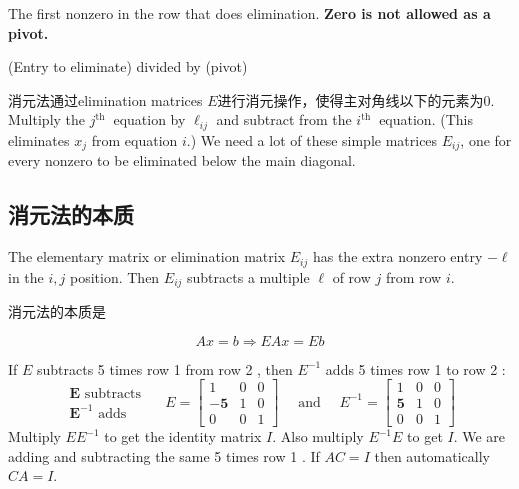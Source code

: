 \begin{definition}[Pivot]
    The first nonzero in the row that does elimination. \textbf{Zero is not allowed as a pivot.}
\end{definition}

\begin{definition}[Multiplier]
    (Entry to eliminate) divided by (pivot)
\end{definition}

消元法通过elimination matrices $E$进行消元操作，使得主对角线以下的元素为0. Multiply the $ j^{\text {th }} $ equation by $ \ell_{i j} $ and subtract from the $ i^{\text {th }} $ equation. (This eliminates $ x_{j} $ from equation $ i $.) We need a lot of these simple matrices $ E_{i j} $, one for every nonzero to be eliminated below the main diagonal.

\subsection{消元法的本质}

\begin{definition}
    The elementary matrix or elimination matrix $ E_{i j} $ has the extra nonzero entry $ -\ell $ in the $ i, j $ position. Then $ E_{i j} $ subtracts a multiple $ \ell $ of row $ j $ from row $ i $.
\end{definition}

\begin{theorem}
    消元法的本质是

    \begin{equation}Ax= b \Rightarrow EAx = Eb\end{equation}
\end{theorem}

\begin{example}
    If $ E $ subtracts 5 times row 1 from row 2 , then $ E^{-1} $ adds 5 times row 1 to row 2 :
$$
\begin{array}{c}
\boldsymbol{E} \text { subtracts } \\
\boldsymbol{E}^{-1} \text { adds }
\end{array} \quad E=\left[\begin{array}{rll}
1 & 0 & 0 \\
-\mathbf{5} & 1 & 0 \\
0 & 0 & 1
\end{array}\right] \quad \text { and } \quad E^{-1}=\left[\begin{array}{lll}
1 & 0 & 0 \\
\mathbf{5} & 1 & 0 \\
0 & 0 & 1
\end{array}\right]
$$
Multiply $ E E^{-1} $ to get the identity matrix $ I $. Also multiply $ E^{-1} E $ to get $ I $. We are adding and subtracting the same 5 times row 1 . If $ A C=I $ then automatically $ C A=I $.
\end{example}

